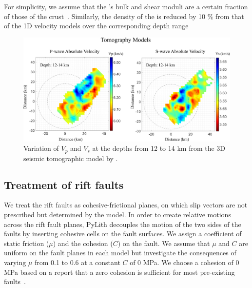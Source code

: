 \documentclass[draft]{agujournal2018}
\begin{document}
For simplicity, we assume that the 's bulk and shear moduli are a certain fraction of those of the crust~\citep[e.g.,][]{Baird_2010}. Similarly, the density of the  is reduced by 10 \% from that of the 1D velocity models over the corresponding depth range 

\begin{figure}[ht]
\centering
\includegraphics[width=30pc]{Figures/TOMO_vel_models.png}
\caption{Variation of $V_p$ and $V_s$ at the depths from 12 to 14 km from the 3D seismic tomographic model by \citet{Powell_2017}.}
\label{figfour}
\end{figure}

\subsection{Treatment of rift faults}
We treat the rift faults as cohesive-frictional planes, on which slip vectors are not prescribed but determined by the model. In order to create relative motions across the rift fault planes, PyLith decouples the motion of the two sides of the faults by inserting cohesive cells on the fault surfaces. We assign a coefficient of static friction ($\mu$) and the cohesion ($C$) on the fault. We assume that $\mu$ and $C$ are uniform on the fault planes in each model but investigate the consequences of varying $\mu$ from 0.1 to 0.6 at a constant $C$ of 0 MPa.  We choose a cohesion of 0 MPa based on a report that a zero cohesion is sufficient for most pre-existing faults~\citep{Marone_Chris}.
\end{document}
